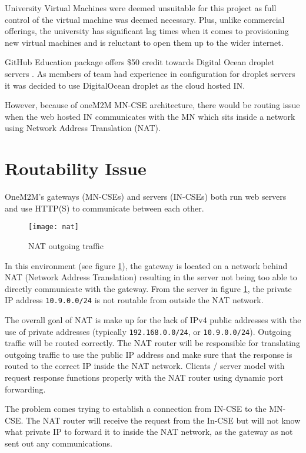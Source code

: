 University Virtual Machines \cite{UniversityofSouthampton2017VMService} were deemed unsuitable for this project as full control of the virtual machine was deemed necessary. Plus, unlike commercial offerings, the university has significant lag times when it comes to provisioning new virtual machines and is reluctant to open them up to the wider internet.

GitHub Education package offers \$50 credit towards Digital Ocean droplet servers \cite{Github2018StudentPack}. As members of team had experience in configuration for droplet servers it was decided to use DigitalOcean droplet as the cloud hosted IN.

However, because of oneM2M MN-CSE architecture, there would be routing issue when the web hosted IN communicates with the MN which sits inside a network using Network Address Translation (NAT). 

\section{Routability Issue}

OneM2M's gateways (MN-CSEs) and servers (IN-CSEs) both run web servers and use HTTP(S) to communicate between each other. 

\begin{figure}[H]
  \centering
  \texttt{[image: nat]}
  \caption[NAT outgoing traffic]{NAT outgoing traffic}
  \label{fig:net}
\end{figure}

In this environment (see figure \ref{fig:net}), the gateway is located on a network behind NAT (Network Address Translation) resulting in the server not being too able to directly communicate with the gateway. From the server in figure \ref{fig:net}, the private IP address \lstinline{10.9.0.0/24} is not routable from outside the NAT network. 
  
The overall goal of NAT is make up for the lack of IPv4 public addresses with the use of private addresses (typically \lstinline{192.168.0.0/24}, or \lstinline{10.9.0.0/24}). Outgoing traffic will be routed correctly. The NAT router will be responsible for translating outgoing traffic to use the public IP address and make sure that the response is routed to the correct IP inside the NAT network. Clients / server model with request response functions properly with the NAT router using dynamic port forwarding. 
    
The problem comes trying to establish a connection from IN-CSE to the MN-CSE. The NAT router will receive the request from the In-CSE but will not know what private IP to forward it to inside the NAT network, as the gateway as not sent out any communications. 

